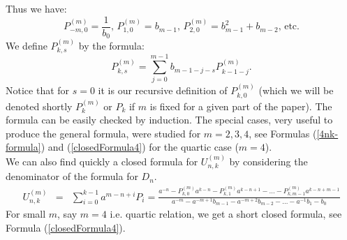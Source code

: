\documentclass[12pt]{amsart}
\begin{document}
Thus we have: 
\begin{equation*}
P_{-m,0}^{(m)}=\frac{1}{b_0},\,P_{1,0}^{(m)}=b_{m-1},\, P_{2,0}^{(m)}=b_{m-1}^2+b_{m-2},\,\text{etc.}  
\end{equation*}
We define $P^{(m)}_{k,s}$ by the formula:
$$P^{(m)}_{k,s}= \sum_{j=0}^{m-1} b_{m-1-j-s}P^{(m)}_{k-1-j}.$$
Notice that for $s=0$ it is our recursive definition of $P^{(m)}_{k,0}$ 
(which we will be denoted shortly $P^{(m)}_k$ or $P_k$ if $m$ is fixed for a given part of the paper).
The formula can be easily checked by induction. The special cases, very useful to produce the general formula, were studied for $m=2,3,4$, see Formulas (\ref{4nk-formula}) and (\ref{closedFormula4}) for the quartic case ($m=4$).\\
We can also find quickly a closed formula for $U^{(m)}_{n,k}$ by considering the denominator of the formula for $D_n$.
\begin{eqnarray}
\label{Identity-m}
U^{(m)}_{n,k} &=& \sum_{i=0}^{k-1}a^{m-n+i}P_i = \frac{a^{-n}-P_{k,0}^{(m)} a^{k-n} - P_{k,1}^{(m)} a^{k-n+1} - \ldots - P_{k,m-1}^{(m)}a^{k-n+m-1}}{a^{-m}- a^{-m+1}b_{m-1} -a^{-m+2}b_{m-2} - \ldots -a^{-1}b_1-b_0}
\end{eqnarray}
For small $m$, say $m=4$ i.e. quartic  relation, we get a short closed formula, see Formula  (\ref{closedFormula4}). 
\end{document}
